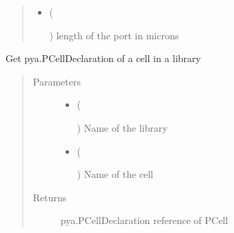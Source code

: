 \documentclass[a4paper,10pt,english]{sphinxmanual}
\begin{document}
\begin{fulllineitems}
\begin{fulllineitems}
\begin{quote}
\begin{description}
\begin{itemize}
\item {} 
 (%
\begin{footnote}[53]\sphinxAtStartFootnote
{}
%
\end{footnote}) \textendash{} length of the port in microns

\end{itemize}

\end{description}\end{quote}

\end{fulllineitems}


\begin{fulllineitems}
\label{\detokenize{photonics:photonics.PhotDevice.decl}}
Get pya.PCellDeclaration of a cell in a library
\begin{quote}\begin{description}
\item[{Parameters}] \leavevmode\begin{itemize}
\item {} 
 (%
\begin{footnote}[54]\sphinxAtStartFootnote
{}
%
\end{footnote}) \textendash{} Name of the library

\item {} 
 (%
\begin{footnote}[55]\sphinxAtStartFootnote
{}
%
\end{footnote}) \textendash{} Name of the cell

\end{itemize}

\item[{Returns}] \leavevmode
pya.PCellDeclaration reference of PCell


\end{description}
\end{quote}
\end{fulllineitems}
\end{fulllineitems}
\end{document}
